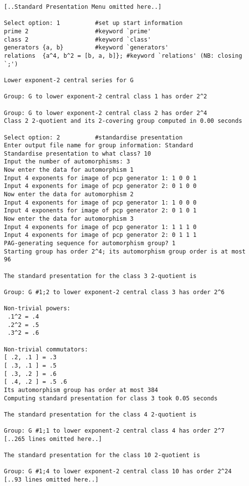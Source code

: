 \documentclass[12pt]{article}
\begin{document}
\begin{verbatim}
[..Standard Presentation Menu omitted here..]

Select option: 1          #set up start information
prime 2                   #keyword `prime'
class 2                   #keyword `class'
generators {a, b}         #keyword `generators'
relations  {a^4, b^2 = [b, a, b]}; #keyword `relations' (NB: closing `;')

Lower exponent-2 central series for G

Group: G to lower exponent-2 central class 1 has order 2^2

Group: G to lower exponent-2 central class 2 has order 2^4
Class 2 2-quotient and its 2-covering group computed in 0.00 seconds

Select option: 2          #standardise presentation
Enter output file name for group information: Standard
Standardise presentation to what class? 10 
Input the number of automorphisms: 3 
Now enter the data for automorphism 1
Input 4 exponents for image of pcp generator 1: 1 0 0 1 
Input 4 exponents for image of pcp generator 2: 0 1 0 0 
Now enter the data for automorphism 2
Input 4 exponents for image of pcp generator 1: 1 0 0 0 
Input 4 exponents for image of pcp generator 2: 0 1 0 1 
Now enter the data for automorphism 3
Input 4 exponents for image of pcp generator 1: 1 1 1 0 
Input 4 exponents for image of pcp generator 2: 0 1 1 1 
PAG-generating sequence for automorphism group? 1 
Starting group has order 2^4; its automorphism group order is at most 96 

The standard presentation for the class 3 2-quotient is

Group: G #1;2 to lower exponent-2 central class 3 has order 2^6

Non-trivial powers:
 .1^2 = .4
 .2^2 = .5
 .3^2 = .6

Non-trivial commutators:
[ .2, .1 ] = .3
[ .3, .1 ] = .5
[ .3, .2 ] = .6
[ .4, .2 ] = .5 .6
Its automorphism group has order at most 384
Computing standard presentation for class 3 took 0.05 seconds

The standard presentation for the class 4 2-quotient is

Group: G #1;1 to lower exponent-2 central class 4 has order 2^7
[..265 lines omitted here..]

The standard presentation for the class 10 2-quotient is

Group: G #1;4 to lower exponent-2 central class 10 has order 2^24
[..93 lines omitted here..]


\end{verbatim}
\end{document}
